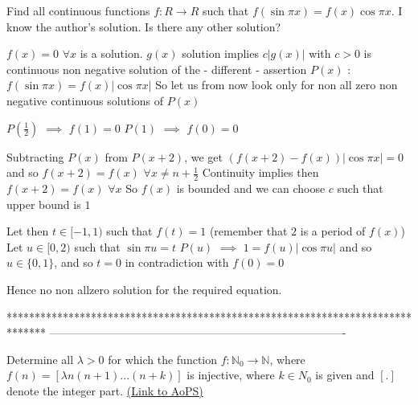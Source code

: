 \begin{solution}
	\begin{tcolorbox}Find all continuous functions $f:R \rightarrow R$  such that $f(\sin{\pi}x)=f(x)\cos{\pi}x$. I know the author's solution. Is there any other solution?\end{tcolorbox}
$\boxed{f(x)=0}$ $\forall x$ is a solution.
$g(x)$ solution implies $c|g(x)|$ with $c>0$ is continuous non negative solution of the - different - assertion $P(x)$ : $f(\sin \pi x)=f(x)|\cos \pi x|$
So let us from now look only for non all zero non negative continuous solutions of $P(x)$

$P(\frac 12)$ $\implies$ $f(1)=0$
$P(1)$ $\implies$ $f(0)=0$

Subtracting $P(x)$ from $P(x+2)$, we get $(f(x+2)-f(x))|\cos \pi x|=0$ and so $f(x+2)=f(x)$ $\forall x\ne n+\frac 12$
Continuity implies then $f(x+2)=f(x)$ $\forall x$
So $f(x)$ is bounded and we can choose $c$ such that upper bound is $1$

Let then $t\in[-1,1)$ such that $f(t)=1$ (remember that $2$ is a period of $f(x)$)
Let $u\in[0,2)$ such that $\sin \pi u=t$
$P(u)$ $\implies$ $1=f(u)|\cos \pi u|$ and so $u\in\{0,1\}$, and so $t=0$ in contradiction with $f(0)=0$

Hence no non allzero solution for the required equation.
\end{solution}
*******************************************************************************
-------------------------------------------------------------------------------

\begin{problem}
	Determine all ${\lambda}>0$ for which the function ${f: \mathbb{N}_0}\to\mathbb{N}$, where $f(n)=[{\lambda}n(n+1)...(n+k)]$ is injective, where $k{\in}N_0$
is given and $[.]$ denote the integer part.
	\flushright \href{https://artofproblemsolving.com/community/c6h561671}{(Link to AoPS)}
\end{problem}



